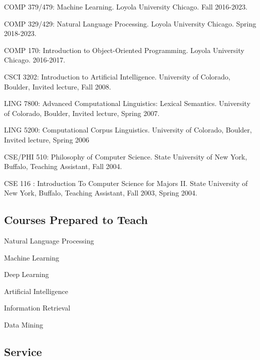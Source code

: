 \documentclass[letterpaper]{article}
\renewenvironment{itemize}{
  \begin{list}{}{
    \setlength{\leftmargin}{1.5em}
  }
}{
  \end{list}
}
\begin{document}
\begin{itemize}
\item COMP 379/479: Machine Learning. Loyola University Chicago. Fall 2016-2023.
\item COMP 329/429: Natural Language Processing. Loyola University Chicago. Spring 2018-2023.
\item COMP 170: Introduction to Object-Oriented Programming. Loyola University Chicago. 2016-2017.
\item CSCI 3202: Introduction to Artificial Intelligence. University of Colorado, Boulder, Invited lecture, Fall 2008.
\item LING 7800: Advanced Computational Linguistics: Lexical Semantics. University of Colorado, Boulder, Invited lecture, Spring 2007.
\item LING 5200: Computational Corpus Linguistics. University of Colorado, Boulder, Invited lecture, Spring 2006
\item CSE/PHI 510: Philosophy of Computer Science. State University of New York, Buffalo, Teaching Assistant, Fall 2004.
\item CSE 116 : Introduction To Computer Science for Majors II. State University of New York, Buffalo, Teaching Assistant, Fall 2003, Spring 2004.
\end{itemize}

\subsection*{Courses Prepared to Teach}

\begin{itemize}
\item Natural Language Processing
\item Machine Learning
\item Deep Learning
\item Artificial Intelligence
\item Information Retrieval
\item Data Mining
\end{itemize}

\subsection*{Service}
\end{document}
